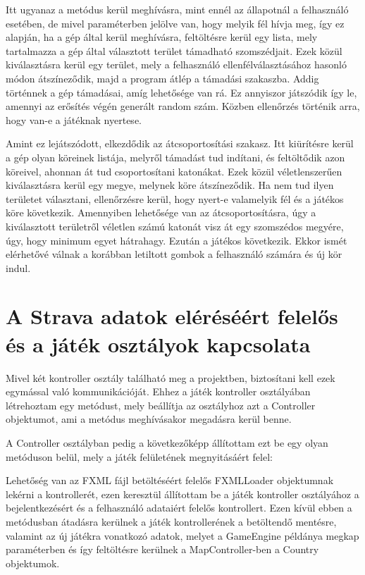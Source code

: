 Itt ugyanaz a metódus kerül meghívásra, mint ennél az állapotnál a felhasználó esetében, de mivel paraméterben jelölve van, hogy melyik fél hívja meg, így ez alapján, ha a gép által kerül meghívásra, feltöltésre kerül egy lista, mely tartalmazza a gép által választott terület támadható szomszédjait. Ezek közül kiválasztásra kerül egy terület, mely a felhasználó ellenfélválasztásához hasonló módon átszíneződik, majd a program átlép a támadási szakaszba. Addig történnek a gép támadásai, amíg lehetősége van rá. Ez annyiszor játszódik így le, amennyi az erősítés végén generált random szám. Közben ellenőrzés történik arra, hogy van-e a játéknak nyertese. 

Amint ez lejátszódott, elkezdődik az átcsoportosítási szakasz. Itt kiürítésre kerül a gép olyan köreinek listája, melyről támadást tud indítani, és feltöltődik azon köreivel, ahonnan át tud csoportosítani katonákat. Ezek közül véletlenszerűen kiválasztásra kerül egy megye, melynek köre átszíneződik. Ha nem tud ilyen területet választani, ellenőrzésre kerül, hogy nyert-e valamelyik fél és a játékos köre következik. Amennyiben lehetősége van az átcsoportosításra, úgy a kiválasztott területről véletlen számú katonát visz át egy szomszédos megyére, úgy, hogy minimum egyet hátrahagy. Ezután a játékos következik. Ekkor ismét elérhetővé válnak a korábban letiltott gombok a felhasználó számára és új kör indul. 

\section{A Strava adatok eléréséért felelős és a játék osztályok kapcsolata}

Mivel két kontroller osztály található meg a projektben, biztosítani kell ezek egymással való kommunikációját. Ehhez a játék kontroller osztályában létrehoztam egy metódust, mely beállítja az osztályhoz azt a Controller objektumot, ami a metódus meghívásakor megadásra kerül benne. 

A Controller osztályban pedig a következőképp állítottam ezt be egy olyan metóduson belül, mely a játék felületének megnyitásáért felel: 

 

Lehetőség van az FXML fájl betöltéséért felelős FXMLLoader objektumnak lekérni a kontrollerét, ezen keresztül állítottam be a játék kontroller osztályához a bejelentkezésért és a felhasználó adataiért felelős kontrollert. Ezen kívül ebben a metódusban átadásra kerülnek a játék kontrollerének a betöltendő mentésre, valamint az új játékra vonatkozó adatok, melyet a GameEngine példánya megkap paraméterben és így feltöltésre kerülnek a MapController-ben a Country objektumok. 

